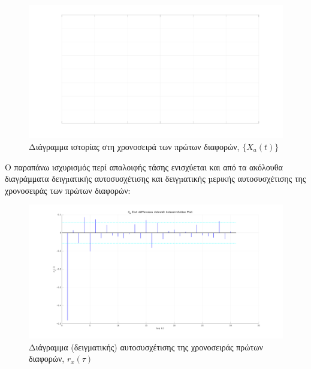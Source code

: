 \begin{figure}[H]
    \begin{center}
        \includegraphics[width=\textwidth]{plots/xa_1st_differences_history.svg.pdf}
        \caption{Διάγραμμα ιστορίας στη χρονοσειρά των πρώτων διαφορών, $\{X_a(t)\}$}
        \label{fig:xa_1st_differences_history}
    \end{center}
\end{figure}

Ο παραπάνω ισχυρισμός περί απαλοιφής τάσης ενισχύεται και από τα ακόλουθα διαγράμματα δειγµατικής αυτοσυσχέτισης και δειγµατικής µερικής αυτοσυσχέτισης της χρονοσειράς των πρώτων διαφορών:

\begin{figure}[H]
    \begin{center}
        \includegraphics[width=\textwidth]{plots/xa_1st_differences_autocorrelation.svg.pdf}
        \caption{Διάγραμμα (δειγματικής) αυτοσυσχέτισης της χρονοσειράς πρώτων διαφορών, $r_x(\tau)$}
        \label{fig:xa_1st_differences_autocorrelation}
    \end{center}
\end{figure}


